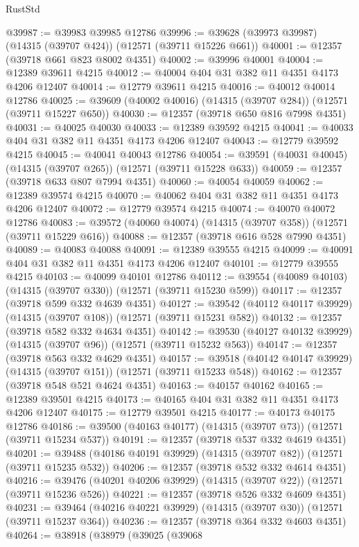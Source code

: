 \begin{lexlean}{RustStd}
\begin{coremodule}
@39987 := @39983 @39985 @12786
@39996 := @39628 (@39973 @39987) (@14315 (@39707 @424)) (@12571 (@39711 @15226 @661))
@40001 := @12357 (@39718 @661 @823 @8002 @4351)
@40002 := @39996 @40001
@40004 := @12389 @39611 @4215
@40012 := @40004 @404 @31 @382 @11 @4351 @4173 @4206 @12407
@40014 := @12779 @39611 @4215
@40016 := @40012 @40014 @12786
@40025 := @39609 (@40002 @40016) (@14315 (@39707 @284)) (@12571 (@39711 @15227 @650))
@40030 := @12357 (@39718 @650 @816 @7998 @4351)
@40031 := @40025 @40030
@40033 := @12389 @39592 @4215
@40041 := @40033 @404 @31 @382 @11 @4351 @4173 @4206 @12407
@40043 := @12779 @39592 @4215
@40045 := @40041 @40043 @12786
@40054 := @39591 (@40031 @40045) (@14315 (@39707 @265)) (@12571 (@39711 @15228 @633))
@40059 := @12357 (@39718 @633 @807 @7994 @4351)
@40060 := @40054 @40059
@40062 := @12389 @39574 @4215
@40070 := @40062 @404 @31 @382 @11 @4351 @4173 @4206 @12407
@40072 := @12779 @39574 @4215
@40074 := @40070 @40072 @12786
@40083 := @39572 (@40060 @40074) (@14315 (@39707 @358)) (@12571 (@39711 @15229 @616))
@40088 := @12357 (@39718 @616 @528 @7990 @4351)
@40089 := @40083 @40088
@40091 := @12389 @39555 @4215
@40099 := @40091 @404 @31 @382 @11 @4351 @4173 @4206 @12407
@40101 := @12779 @39555 @4215
@40103 := @40099 @40101 @12786
@40112 := @39554 (@40089 @40103) (@14315 (@39707 @330)) (@12571 (@39711 @15230 @599))
@40117 := @12357 (@39718 @599 @332 @4639 @4351)
@40127 := @39542 (@40112 @40117 @39929) (@14315 (@39707 @108)) (@12571 (@39711 @15231 @582))
@40132 := @12357 (@39718 @582 @332 @4634 @4351)
@40142 := @39530 (@40127 @40132 @39929) (@14315 (@39707 @96)) (@12571 (@39711 @15232 @563))
@40147 := @12357 (@39718 @563 @332 @4629 @4351)
@40157 := @39518 (@40142 @40147 @39929) (@14315 (@39707 @151)) (@12571 (@39711 @15233 @548))
@40162 := @12357 (@39718 @548 @521 @4624 @4351)
@40163 := @40157 @40162
@40165 := @12389 @39501 @4215
@40173 := @40165 @404 @31 @382 @11 @4351 @4173 @4206 @12407
@40175 := @12779 @39501 @4215
@40177 := @40173 @40175 @12786
@40186 := @39500 (@40163 @40177) (@14315 (@39707 @73)) (@12571 (@39711 @15234 @537))
@40191 := @12357 (@39718 @537 @332 @4619 @4351)
@40201 := @39488 (@40186 @40191 @39929) (@14315 (@39707 @82)) (@12571 (@39711 @15235 @532))
@40206 := @12357 (@39718 @532 @332 @4614 @4351)
@40216 := @39476 (@40201 @40206 @39929) (@14315 (@39707 @22)) (@12571 (@39711 @15236 @526))
@40221 := @12357 (@39718 @526 @332 @4609 @4351)
@40231 := @39464 (@40216 @40221 @39929) (@14315 (@39707 @30)) (@12571 (@39711 @15237 @364))
@40236 := @12357 (@39718 @364 @332 @4603 @4351)
@40264 := @38918
    (@38979
      (@39025
        (@39068

\end{coremodule}
\end{lexlean}
